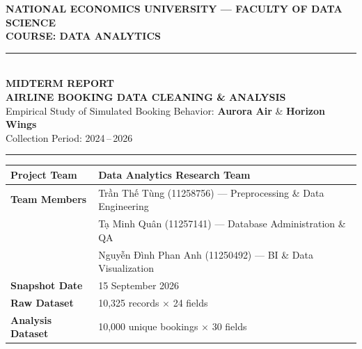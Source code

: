 \documentclass[12pt, a4paper]{report}
\renewcommand{\tablename}{Table}%
\renewcommand{\figurename}{Figure}%
\newcommand{\airline}[1]{\textbf{\textsf{#1}}}
\begin{document}
\renewcommand{\tablename}{Table}
\renewcommand{\figurename}{Figure}

\begin{titlepage}
  \centering
  \vspace*{1.0cm}

  {\large\sffamily\bfseries\color{NavyBlue}
    NATIONAL ECONOMICS UNIVERSITY --- FACULTY OF DATA SCIENCE\\
    COURSE: DATA ANALYTICS\\[0.4em]
  }

  \vspace{1.5cm}
  {\color{NavyBlue}\rule{\textwidth}{2pt}}\\[0.6em]

  {\LARGE\sffamily\bfseries\color{NavyBlue}
    MIDTERM REPORT\\[0.3em]
    AIRLINE BOOKING DATA CLEANING \& ANALYSIS
  }\\[0.6em]

  {\large\sffamily\color{DarkSlate}
    Empirical Study of Simulated Booking Behavior: \airline{Aurora Air} \& \airline{Horizon Wings}\\
    Collection Period: 2024\,--\,2026
  }

  {\color{NavyBlue}\rule{\textwidth}{2pt}}

  \vspace{2.0cm}

  \begin{tabular}{@{}ll@{}}
    \toprule
    \textbf{Project Team}          & Data Analytics Research Team \\
    \midrule
    \textbf{Team Members}       & Trần Thế Tùng (11258756) --- Preprocessing \& Data Engineering \\
                                     & Tạ Minh Quân (11257141) --- Database Administration \& QA \\
                                     & Nguyễn Đình Phan Anh (11250492) --- BI \& Data Visualization \\
    \midrule
    \textbf{Snapshot Date}       & 15 September 2026 \\
    \textbf{Raw Dataset}      & 10,325 records $\times$ 24 fields \\
    \textbf{Analysis Dataset} & 10,000 unique bookings $\times$ 30 fields \\
    \bottomrule
  \end{tabular}

  \vfill
\end{titlepage}
\end{document}

